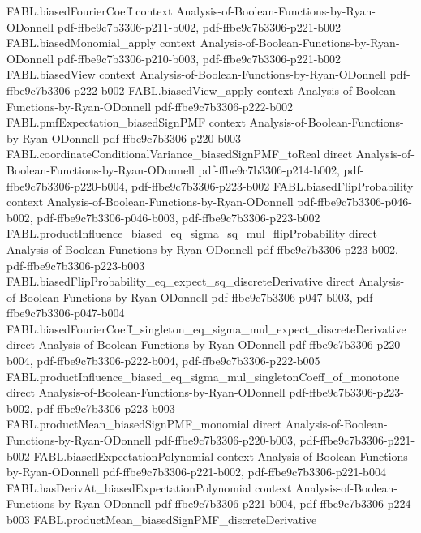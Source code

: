 \begin{theorem}
\proofstep
  {FABL.biasedFourierCoeff}
  {context}
  {Analysis-of-Boolean-Functions-by-Ryan-ODonnell}
  {pdf-ffbe9c7b3306-p211-b002,
    pdf-ffbe9c7b3306-p221-b002}
\proofstep
  {FABL.biasedMonomial_apply}
  {context}
  {Analysis-of-Boolean-Functions-by-Ryan-ODonnell}
  {pdf-ffbe9c7b3306-p210-b003,
    pdf-ffbe9c7b3306-p221-b002}
\proofstep
  {FABL.biasedView}
  {context}
  {Analysis-of-Boolean-Functions-by-Ryan-ODonnell}
  {pdf-ffbe9c7b3306-p222-b002}
\proofstep
  {FABL.biasedView_apply}
  {context}
  {Analysis-of-Boolean-Functions-by-Ryan-ODonnell}
  {pdf-ffbe9c7b3306-p222-b002}
\proofstep
  {FABL.pmfExpectation_biasedSignPMF}
  {context}
  {Analysis-of-Boolean-Functions-by-Ryan-ODonnell}
  {pdf-ffbe9c7b3306-p220-b003}
\proofstep
  {FABL.coordinateConditionalVariance_biasedSignPMF_toReal}
  {direct}
  {Analysis-of-Boolean-Functions-by-Ryan-ODonnell}
  {pdf-ffbe9c7b3306-p214-b002,
    pdf-ffbe9c7b3306-p220-b004,
    pdf-ffbe9c7b3306-p223-b002}
\proofstep
  {FABL.biasedFlipProbability}
  {context}
  {Analysis-of-Boolean-Functions-by-Ryan-ODonnell}
  {pdf-ffbe9c7b3306-p046-b002,
    pdf-ffbe9c7b3306-p046-b003,
    pdf-ffbe9c7b3306-p223-b002}
\proofstep
  {FABL.productInfluence_biased_eq_sigma_sq_mul_flipProbability}
  {direct}
  {Analysis-of-Boolean-Functions-by-Ryan-ODonnell}
  {pdf-ffbe9c7b3306-p223-b002,
    pdf-ffbe9c7b3306-p223-b003}
\proofstep
  {FABL.biasedFlipProbability_eq_expect_sq_discreteDerivative}
  {direct}
  {Analysis-of-Boolean-Functions-by-Ryan-ODonnell}
  {pdf-ffbe9c7b3306-p047-b003,
    pdf-ffbe9c7b3306-p047-b004}
\proofstep
  {FABL.biasedFourierCoeff_singleton_eq_sigma_mul_expect_discreteDerivative}
  {direct}
  {Analysis-of-Boolean-Functions-by-Ryan-ODonnell}
  {pdf-ffbe9c7b3306-p220-b004,
    pdf-ffbe9c7b3306-p222-b004,
    pdf-ffbe9c7b3306-p222-b005}
\proofstep
  {FABL.productInfluence_biased_eq_sigma_mul_singletonCoeff_of_monotone}
  {direct}
  {Analysis-of-Boolean-Functions-by-Ryan-ODonnell}
  {pdf-ffbe9c7b3306-p223-b002,
    pdf-ffbe9c7b3306-p223-b003}
\proofstep
  {FABL.productMean_biasedSignPMF_monomial}
  {direct}
  {Analysis-of-Boolean-Functions-by-Ryan-ODonnell}
  {pdf-ffbe9c7b3306-p220-b003,
    pdf-ffbe9c7b3306-p221-b002}
\proofstep
  {FABL.biasedExpectationPolynomial}
  {context}
  {Analysis-of-Boolean-Functions-by-Ryan-ODonnell}
  {pdf-ffbe9c7b3306-p221-b002,
    pdf-ffbe9c7b3306-p221-b004}
\proofstep
  {FABL.hasDerivAt_biasedExpectationPolynomial}
  {context}
  {Analysis-of-Boolean-Functions-by-Ryan-ODonnell}
  {pdf-ffbe9c7b3306-p221-b004,
    pdf-ffbe9c7b3306-p224-b003}
\proofstep
  {FABL.productMean_biasedSignPMF_discreteDerivative}

\end{theorem}
